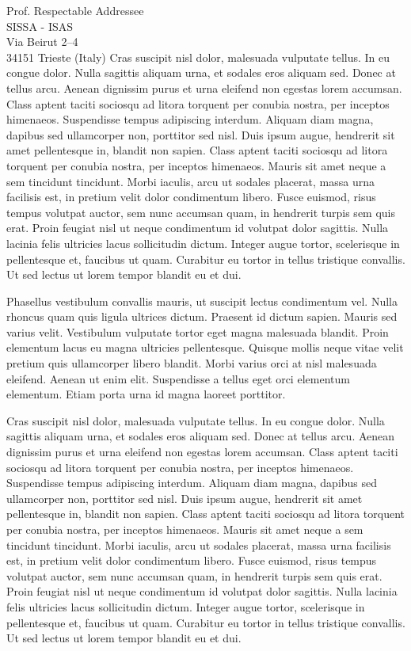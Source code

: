\documentclass[10pt,english,a4paper]{letteracdp}
\begin{document}
\begin{foldedletter}{
    Prof. Respectable Addressee\\
    SISSA - ISAS\\
    Via Beirut 2--4\\
    34151 Trieste (Italy)
  }
Cras suscipit nisl dolor, malesuada vulputate tellus. In eu congue dolor. Nulla sagittis aliquam urna, et sodales eros aliquam sed. Donec at tellus arcu. Aenean dignissim purus et urna eleifend non egestas lorem accumsan. Class aptent taciti sociosqu ad litora torquent per conubia nostra, per inceptos himenaeos. Suspendisse tempus adipiscing interdum. Aliquam diam magna, dapibus sed ullamcorper non, porttitor sed nisl. Duis ipsum augue, hendrerit sit amet pellentesque in, blandit non sapien. Class aptent taciti sociosqu ad litora torquent per conubia nostra, per inceptos himenaeos. Mauris sit amet neque a sem tincidunt tincidunt. Morbi iaculis, arcu ut sodales placerat, massa urna facilisis est, in pretium velit dolor condimentum libero. Fusce euismod, risus tempus volutpat auctor, sem nunc accumsan quam, in hendrerit turpis sem quis erat. Proin feugiat nisl ut neque condimentum id volutpat dolor sagittis. Nulla lacinia felis ultricies lacus sollicitudin dictum. Integer augue tortor, scelerisque in pellentesque et, faucibus ut quam. Curabitur eu tortor in tellus tristique convallis. Ut sed lectus ut lorem tempor blandit eu et dui.

Phasellus vestibulum convallis mauris, ut suscipit lectus condimentum vel. Nulla rhoncus quam quis ligula ultrices dictum. Praesent id dictum sapien. Mauris sed varius velit. Vestibulum vulputate tortor eget magna malesuada blandit. Proin elementum lacus eu magna ultricies pellentesque. Quisque mollis neque vitae velit pretium quis ullamcorper libero blandit. Morbi varius orci at nisl malesuada eleifend. Aenean ut enim elit. Suspendisse a tellus eget orci elementum elementum. Etiam porta urna id magna laoreet porttitor.

Cras suscipit nisl dolor, malesuada vulputate tellus. In eu congue dolor. Nulla sagittis aliquam urna, et sodales eros aliquam sed. Donec at tellus arcu. Aenean dignissim purus et urna eleifend non egestas lorem accumsan. Class aptent taciti sociosqu ad litora torquent per conubia nostra, per inceptos himenaeos. Suspendisse tempus adipiscing interdum. Aliquam diam magna, dapibus sed ullamcorper non, porttitor sed nisl. Duis ipsum augue, hendrerit sit amet pellentesque in, blandit non sapien. Class aptent taciti sociosqu ad litora torquent per conubia nostra, per inceptos himenaeos. Mauris sit amet neque a sem tincidunt tincidunt. Morbi iaculis, arcu ut sodales placerat, massa urna facilisis est, in pretium velit dolor condimentum libero. Fusce euismod, risus tempus volutpat auctor, sem nunc accumsan quam, in hendrerit turpis sem quis erat. Proin feugiat nisl ut neque condimentum id volutpat dolor sagittis. Nulla lacinia felis ultricies lacus sollicitudin dictum. Integer augue tortor, scelerisque in pellentesque et, faucibus ut quam. Curabitur eu tortor in tellus tristique convallis. Ut sed lectus ut lorem tempor blandit eu et dui.


\end{foldedletter}
\end{document}
